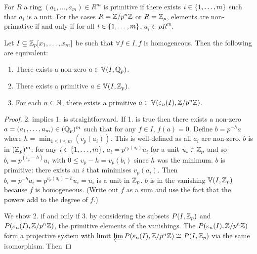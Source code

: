 \begin{dfn}[Primitive]
    For $R$ a ring $(a_1, \dots, a_m) \in R^m$ is primitive if
    there exists $i \in \left\{1,\dots,m\right\}$ such that $a_i$ is a unit.
    For the cases $R = \mathbb{Z}/p^{n}\mathbb{Z}$ or $R = \mathbb{Z}_p$, 
    elements are non-primative if and only if for all 
    $i \in \left\{1,\dots,m\right\}$, $a_i \in p R^m$.
\end{dfn}

\begin{prop}
    Let $I \subseteq \mathbb{Z}_p[x_1,\dots, x_m]$ be such that 
    $\forall f \in I, f$ is homogeneous.
    Then the following are equivalent:
    \begin{enumerate}
        \item There exists a non-zero $a \in \mathbb{V}(I,\mathbb{Q}_p)$.
        \item There exists a primitive $a \in \mathbb{V}(I,\mathbb{Z}_p)$.
        \item For each $n \in \mathbb{N}$, 
            there exists a primitive $a \in \mathbb{V}(\varepsilon_n(I),\mathbb{Z}/p^{n}\mathbb{Z})$.
    \end{enumerate}
\end{prop}
\begin{proof}
    2. implies 1. is straightforward. 
    If 1. is true then there exists a non-zero 
    $a = (a_1,\dots,a_m) \in (\mathbb{Q}_p)^m$
    such that for any $f \in I$, $f(a)=0$.
    Define $b = p^{-h} a$ where $h = \min_{1 \le i \le m} (v_p(a_i))$.
    This is well-defined as all $a_i$ are non-zero.
    $b$ is in $(\mathbb{Z}_p)^m$: for any $i \in \left\{1, \dots ,m\right\}$,
    $a_i = p^{v_p(a_i)} u_i$ for a unit $u_i \in \mathbb{Z}_p$ and so
    $b_i = p^(v_p - h) u_i$ with $0 \le v_p - h = v_p(b_i)$
    since $h$ was the minimum.
    $b$ is primitive: 
    there exists an $i$ that minimises $v_p(a_i)$.
    Then $b_i = p^{-h} a_i = p^{v_p(a_i) - h} u_i = u_i$ 
    is a unit in $\mathbb{Z}_p$.
    $b$ is in the vanishing $\mathbb{V}(I,\mathbb{Z}_p)$ because $f$ is homogeneous.
    (Write out $f$ as a sum and use the fact that the powers add to 
    the degree of $f$.)

    We show 2. if and only if 3. by considering the subsets
    $P(I, \mathbb{Z}_p)$ and $P(\varepsilon_n(I),\mathbb{Z}/p^{n}\mathbb{Z})$, 
    the primitive elements of the vanishings.
    The $P(\varepsilon_n(I),\mathbb{Z}/p^{n}\mathbb{Z})$ form a projective system with limit
    $\varprojlim P(\varepsilon_n(I),\mathbb{Z}/p^{n}\mathbb{Z}) \cong_{} P(I, \mathbb{Z}_p)$ via the same
    isomorphism. 
    Then 
\end{proof}

